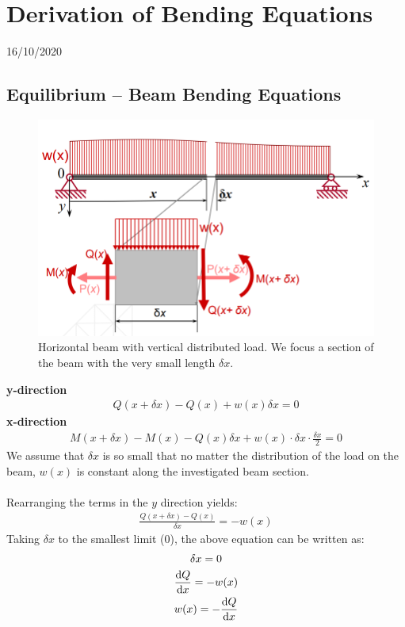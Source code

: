 \documentclass[class=report, crop=false, 12pt,a4paper]{standalone}
\begin{document}
\section{Derivation of Bending Equations}
\begin{center}
  16/10/2020
\end{center}
\subsection{Equilibrium – Beam Bending Equations}
\begin{figure}[H]
  \centering
  \includegraphics[width = 0.8 \textwidth]{../img/beam1.PNG}
  \caption{Horizontal beam with vertical distributed load. We focus a section of the beam with the very small length $\delta x$.}
\end{figure}
\textbf{y-direction}
\begin{gather}
  Q(x+\delta x) - Q(x) + w(x)\delta x = 0
\end{gather}
\textbf{x-direction}
\begin{gather}
  M(x+\delta x) - M(x) - Q(x)\delta x + w(x)\cdot \delta x \cdot \frac{\delta x}{2} = 0
\end{gather}
We assume that $\delta x$ is so small that no matter the distribution of the load on the beam, $w(x)$ is constant along the investigated beam section. \\\\
Rearranging the terms in the $y$ direction yields: 
\begin{gather}
  \frac{Q(x+\delta x)-Q(x)}{\delta x} = -w(x)
\end{gather}
Taking $\delta x$ to the smallest limit (0), the above equation can be written as:
\begin{gather}
  \delta x = 0 \\
  \frac{\dif Q}{\dif x} = -w(x) \\
  w(x) = -\frac{\dif Q}{\dif x}
  \label{loadiny}
\end{gather}
\end{document}
